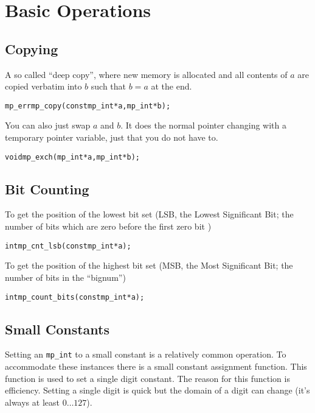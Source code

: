 \documentclass[synpaper]{book}
\begin{document}
\chapter{Basic Operations}
\section{Copying}

A so called ``deep copy'', where new memory is allocated and all contents of $a$ are copied
verbatim into $b$ such that $b = a$ at the end.

\begin{alltt}
mp_err mp_copy (const mp_int *a, mp_int *b);
\end{alltt}

You can also just swap $a$ and $b$. It does the normal pointer changing with a temporary pointer
variable, just that you do not have to.

\begin{alltt}
void mp_exch (mp_int *a, mp_int *b);
\end{alltt}

\section{Bit Counting}

To get the position of the lowest bit set (LSB, the Lowest Significant Bit; the number of bits
which are zero before the first zero bit )

\begin{alltt}
int mp_cnt_lsb(const mp_int *a);
\end{alltt}

To get the position of the highest bit set (MSB, the Most Significant Bit; the number of bits in
the ``bignum'')

\begin{alltt}
int mp_count_bits(const mp_int *a);
\end{alltt}

\section{Small Constants}
Setting an \texttt{mp\_int} to a small constant is a relatively common operation.  To accommodate
these instances there is a small constant assignment function.	This function is used to set a
single digit constant. The reason for this function is efficiency.  Setting a single digit is quick
but the domain of a digit can change (it's always at least $0 \ldots 127$).
\end{document}
